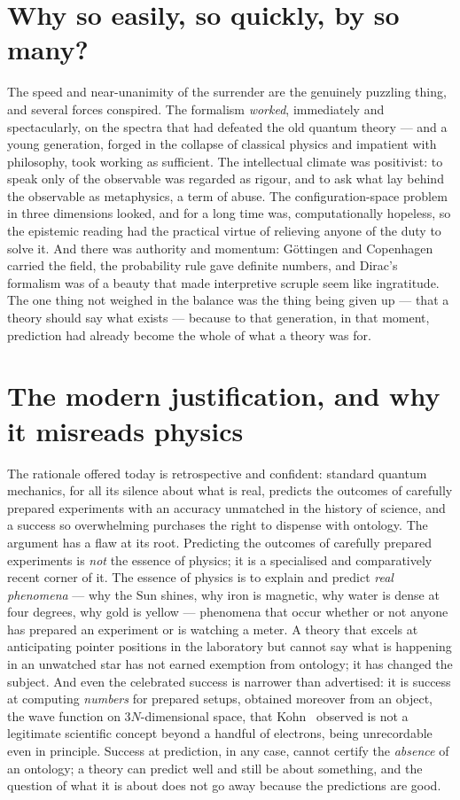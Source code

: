 \documentclass[11pt]{article}
\begin{document}
\section{Why so easily, so quickly, by so many?}

The speed and near-unanimity of the surrender are the genuinely puzzling thing, and several forces conspired.
The formalism \emph{worked}, immediately and spectacularly, on the spectra that had defeated the old quantum
theory --- and a young generation, forged in the collapse of classical physics and impatient with philosophy,
took working as sufficient. The intellectual climate was positivist: to speak only of the observable was
regarded as rigour, and to ask what lay behind the observable as metaphysics, a term of abuse. The
configuration-space problem in three dimensions looked, and for a long time was, computationally hopeless, so the
epistemic reading had the practical virtue of relieving anyone of the duty to solve it. And there was authority
and momentum: G\"ottingen and Copenhagen carried the field, the probability rule gave definite numbers, and
Dirac's formalism was of a beauty that made interpretive scruple seem like ingratitude. The one thing not
weighed in the balance was the thing being given up --- that a theory should say what exists --- because to that
generation, in that moment, prediction had already become the whole of what a theory was for.

\section{The modern justification, and why it misreads physics}

The rationale offered today is retrospective and confident: standard quantum mechanics, for all its silence
about what is real, predicts the outcomes of carefully prepared experiments with an accuracy unmatched in the
history of science, and a success so overwhelming purchases the right to dispense with ontology. The argument has
a flaw at its root. Predicting the outcomes of carefully prepared experiments is \emph{not} the essence of
physics; it is a specialised and comparatively recent corner of it. The essence of physics is to explain and
predict \emph{real phenomena} --- why the Sun shines, why iron is magnetic, why water is dense at four degrees,
why gold is yellow --- phenomena that occur whether or not anyone has prepared an experiment or is watching a
meter. A theory that excels at anticipating pointer positions in the laboratory but cannot say what is happening
in an unwatched star has not earned exemption from ontology; it has changed the subject. And even the celebrated
success is narrower than advertised: it is success at computing \emph{numbers} for prepared setups, obtained
moreover from an object, the wave function on $3N$-dimensional space, that Kohn~\cite{Kohn99} observed is not a legitimate
scientific concept beyond a handful of electrons, being unrecordable even in principle. Success at prediction, in
any case, cannot certify the \emph{absence} of an ontology; a theory can predict well and still be about
something, and the question of what it is about does not go away because the predictions are good.
\end{document}
